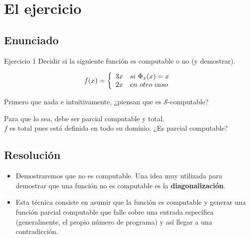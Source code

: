 \documentclass[compress]{beamer}
\newcommand{\bigpause}{\bigskip \pause}
\begin{document}
\section{El ejercicio}
\subsection{Enunciado}
\begin{frame}
\begin{block}{Ejercicio 1}
Decidir si la siguiente funci\'on es computable o no (y demostrar).

$$f(x) = \left\{
\begin{array}{c l}
 3x & si\ \Phi_x(x) = x\\
 2x & en\ otro\ caso
\end{array}
\right.
$$

\end{block}
\bigpause

Primero que nada e intuitivamente, ¿piensan que es $\mathcal{S}$-computable?
\bigskip

Para que lo sea, debe ser parcial computable y total. \\
$f$ es total pues est\'a definida en todo su dominio. ¿Es parcial computable?

\end{frame}

\subsection{Resoluci\'on}
\begin{frame}
\begin{itemize}
\item Demostraremos que no es computable. Una idea muy utilizada para demostrar que una funci\'on no es computable es la \textbf{diagonalizaci\'on}.\\
\bigskip
\item Esta t\'ecnica consiste en asumir que la funci\'on es computable y generar una funci\'on parcial computable que falle sobre una entrada espec\'ifica (generalmente, el propio n\'umero de programa) y as\'i llegar a una contradicci\'on.

\end{itemize}
\end{frame}
\end{document}
